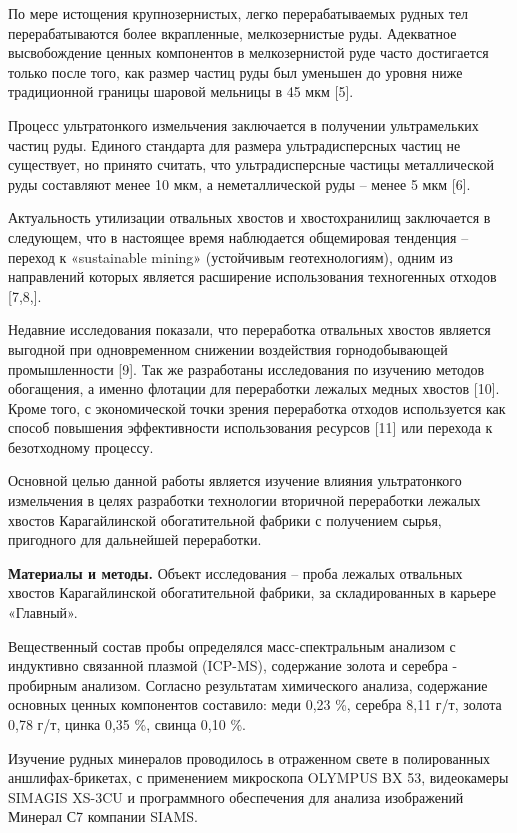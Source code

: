 По мере истощения крупнозернистых, легко перерабатываемых рудных тел
перерабатываются более вкрапленные, мелкозернистые руды. Адекватное
высвобождение ценных компонентов в мелкозернистой руде часто достигается
только после того, как размер частиц руды был уменьшен до уровня ниже
традиционной границы шаровой мельницы в 45 мкм {[}5{]}.

Процесс ультратонкого измельчения заключается в получении ультрамельких
частиц руды. Единого стандарта для размера ультрадисперсных частиц не
существует, но принято считать, что ультрадисперсные частицы
металлической руды составляют менее 10 мкм, а неметаллической руды --
менее 5 мкм {[}6{]}.

Актуальность утилизации отвальных хвостов и хвостохранилищ заключается в
следующем, что в настоящее время наблюдается общемировая тенденция --
переход к «sustainable mining» (устойчивым геотехнологиям), одним из
направлений которых является расширение использования техногенных
отходов {[}7,8,{]}.

Недавние исследования показали, что переработка отвальных хвостов
является выгодной при одновременном снижении воздействия горнодобывающей
промышленности {[}9{]}. Так же разработаны исследования по изучению
методов обогащения, а именно флотации для переработки лежалых медных
хвостов {[}10{]}. Кроме того, с экономической точки зрения переработка
отходов используется как способ повышения эффективности использования
ресурсов {[}11{]} или перехода к безотходному процессу.

Основной целью данной работы является изучение влияния ультратонкого
измельчения в целях разработки технологии вторичной переработки лежалых
хвостов Карагайлинской обогатительной фабрики с получением сырья,
пригодного для дальнейшей переработки.

{\bfseries Материалы и методы.} Объект исследования -- проба лежалых
отвальных хвостов Карагайлинской обогатительной фабрики, за
складированных в карьере «Главный».

Вещественный состав пробы определялся масс-спектральным анализом с
индуктивно связанной плазмой (ICP-MS), содержание золота и серебра -
пробирным анализом. Согласно результатам химического анализа, содержание
основных ценных компонентов составило: меди 0,23 \%, серебра 8,11 г/т,
золота 0,78 г/т, цинка 0,35 \%, свинца 0,10 \%.

Изучение рудных минералов проводилось в отраженном свете в полированных
аншлифах-брикетах, с применением микроскопа OLYMPUS BX 53, видеокамеры
SIMAGIS XS-3CU и программного обеспечения для анализа изображений
Минерал С7 компании SIAMS.

